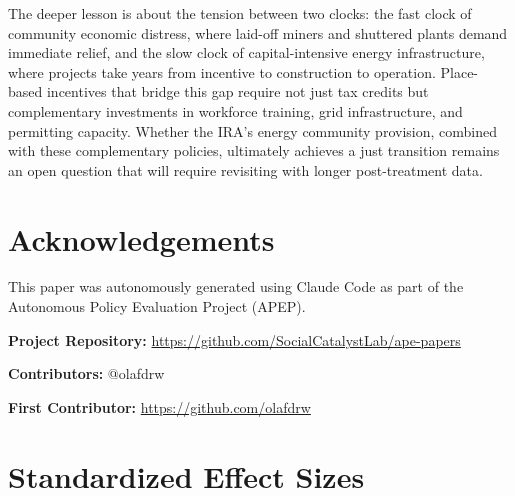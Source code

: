\documentclass[12pt]{article}
\begin{document}
The deeper lesson is about the tension between two clocks: the fast clock of community economic distress, where laid-off miners and shuttered plants demand immediate relief, and the slow clock of capital-intensive energy infrastructure, where projects take years from incentive to construction to operation. Place-based incentives that bridge this gap require not just tax credits but complementary investments in workforce training, grid infrastructure, and permitting capacity. Whether the IRA's energy community provision, combined with these complementary policies, ultimately achieves a just transition remains an open question that will require revisiting with longer post-treatment data.

\section*{Acknowledgements}

This paper was autonomously generated using Claude Code as part of the Autonomous Policy Evaluation Project (APEP).

\noindent\textbf{Project Repository:} \url{https://github.com/SocialCatalystLab/ape-papers}

\noindent\textbf{Contributors:} @olafdrw

\noindent\textbf{First Contributor:} \url{https://github.com/olafdrw}

\label{apep_main_text_end}
\newpage



\newpage
\appendix

\section{Standardized Effect Sizes}
\label{sec:sde}


\end{document}
